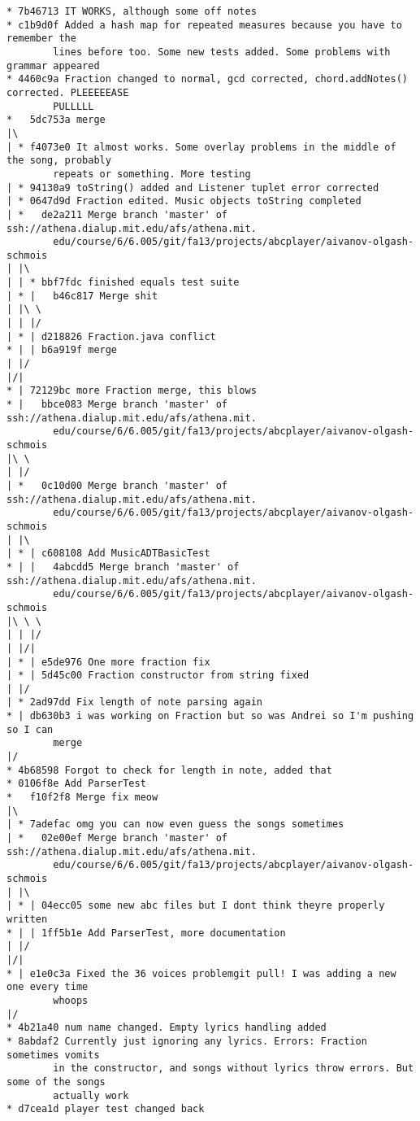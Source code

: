 \documentclass[12pt]{book}
\begin{document}
\begin{Verbatim}
* 7b46713 IT WORKS, although some off notes
* c1b9d0f Added a hash map for repeated measures because you have to remember the 
        lines before too. Some new tests added. Some problems with grammar appeared
* 4460c9a Fraction changed to normal, gcd corrected, chord.addNotes() corrected. PLEEEEEASE 
        PULLLLL
*   5dc753a merge
|\
| * f4073e0 It almost works. Some overlay problems in the middle of the song, probably 
        repeats or something. More testing
| * 94130a9 toString() added and Listener tuplet error corrected
| * 0647d9d Fraction edited. Music objects toString completed
| *   de2a211 Merge branch 'master' of ssh://athena.dialup.mit.edu/afs/athena.mit.
        edu/course/6/6.005/git/fa13/projects/abcplayer/aivanov-olgash-schmois
| |\
| | * bbf7fdc finished equals test suite
| * |   b46c817 Merge shit
| |\ \
| | |/
| * | d218826 Fraction.java conflict
* | | b6a919f merge
| |/
|/|
* | 72129bc more Fraction merge, this blows
* |   bbce083 Merge branch 'master' of ssh://athena.dialup.mit.edu/afs/athena.mit.
        edu/course/6/6.005/git/fa13/projects/abcplayer/aivanov-olgash-schmois
|\ \
| |/
| *   0c10d00 Merge branch 'master' of ssh://athena.dialup.mit.edu/afs/athena.mit.
        edu/course/6/6.005/git/fa13/projects/abcplayer/aivanov-olgash-schmois
| |\
| * | c608108 Add MusicADTBasicTest
* | |   4abcdd5 Merge branch 'master' of ssh://athena.dialup.mit.edu/afs/athena.mit.
        edu/course/6/6.005/git/fa13/projects/abcplayer/aivanov-olgash-schmois
|\ \ \
| | |/
| |/|
| * | e5de976 One more fraction fix
| * | 5d45c00 Fraction constructor from string fixed
| |/
| * 2ad97dd Fix length of note parsing again
* | db630b3 i was working on Fraction but so was Andrei so I'm pushing so I can 
        merge
|/
* 4b68598 Forgot to check for length in note, added that
* 0106f8e Add ParserTest
*   f10f2f8 Merge fix meow
|\
| * 7adefac omg you can now even guess the songs sometimes
| *   02e00ef Merge branch 'master' of ssh://athena.dialup.mit.edu/afs/athena.mit.
        edu/course/6/6.005/git/fa13/projects/abcplayer/aivanov-olgash-schmois
| |\
| * | 04ecc05 some new abc files but I dont think theyre properly written
* | | 1ff5b1e Add ParserTest, more documentation
| |/
|/|
* | e1e0c3a Fixed the 36 voices problemgit pull! I was adding a new one every time 
        whoops
|/
* 4b21a40 num name changed. Empty lyrics handling added
* 8abdaf2 Currently just ignoring any lyrics. Errors: Fraction sometimes vomits 
        in the constructor, and songs without lyrics throw errors. But some of the songs 
        actually work
* d7cea1d player test changed back

\end{Verbatim}
\end{document}

